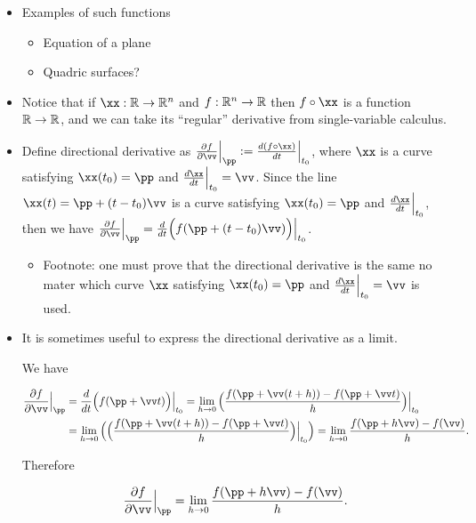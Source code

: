 \begin{itemize}
    \item Examples of such functions
    \begin{itemize}
        \item Equation of a plane
        \item Quadric surfaces?
    \end{itemize}
    
    \item Notice that if $\xx:\R \rightarrow \R^n$ and $f:\mathbb{R}^n \rightarrow \mathbb{R}$ then $f \circ \xx$ is a function $\mathbb{R} 
    \rightarrow \mathbb{R}$, and we can take its ``regular'' derivative from single-variable calculus.

    \item Define directional derivative as $\frac{\pd f}{\pd \vv} \Big|_\pp := \frac{d (f \circ \xx)}{dt}\Big|_{t_0}$, where $\xx$ is a curve satisfying $\xx(t_0) = \pp$ and $\frac{d\xx}{dt}\Big|_{t_0} = \vv$. Since the line $\xx(t) = \pp + (t - t_0) \vv$ is a curve satisfying $\xx(t_0) = \pp$ and $\frac{d\xx}{dt}\Big|_{t_0}$, then we have $\frac{\pd f}{\pd \vv} \Big|_\pp = \frac{d}{dt}\Big(f(\pp + (t - t_0) \vv) \Big)\Big|_{t_0}$.
    \begin{itemize}
        \item Footnote: one must prove that the directional derivative is the same no mater which curve $\xx$ satisfying $\xx(t_0) = \pp$ and $\frac{d\xx}{dt}\Big|_{t_0} = \vv$ is used.
    \end{itemize}
    
    \item It is sometimes useful to express the directional derivative as a limit. 
        
        We have
        
        \begin{align*}
            \frac{\pd f}{\pd \vv}\Big|_\pp 
            &= \frac{d}{dt}\Big(f(\pp + \vv t)\Big)\Big|_{t_0}
            = \lim_{h \rightarrow 0} \Big( \frac{f(\pp + \vv(t + h)) - f(\pp + \vv t)}{h} \Big) \Big|_{t_0} \\
            &= \lim_{h \rightarrow 0} \Big( \Big( \frac{f(\pp + \vv(t + h)) - f(\pp + \vv t)}{h} \Big) \Big|_{t_0} \Big)
            = \lim_{h \rightarrow 0} \frac{f(\pp + h\vv) - f(\vv)}{h}.
        \end{align*}
        
        Therefore
        
        \begin{align*}
            \frac{\pd f}{\pd \vv}\Big|_\pp = \lim_{h \rightarrow 0} \frac{f(\pp + h\vv) - f(\vv)}{h}.
        \end{align*}
        

\end{itemize}
